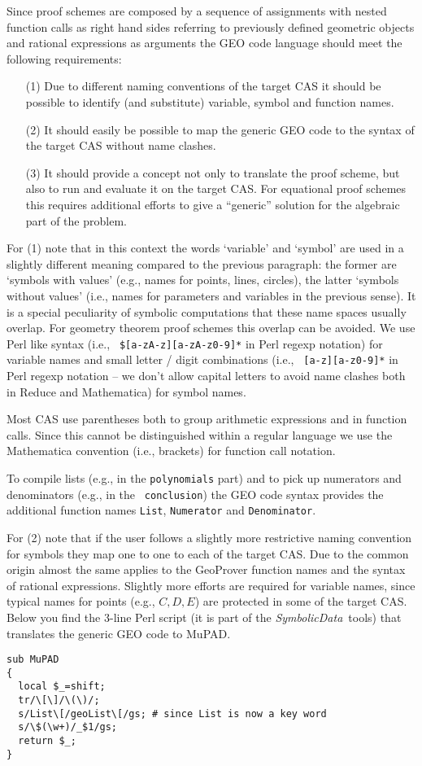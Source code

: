 \documentclass[11pt]{article}
\newcommand{\SD}{{\it Symbo\-lic\-Data}}
\begin{document}
Since proof schemes are composed by a sequence of assignments
with nested function calls as right hand sides referring to
previously defined geometric objects and rational expressions as
arguments the GEO code language should meet the following
requirements:
\begin{itemize}\itemsep0pt
\item[(1)] Due to different naming conventions of the target CAS
it should be possible to identify (and substitute) variable,
symbol and function names.
\item[(2)] It should easily be possible to map the generic GEO
code to the syntax of the target CAS without name clashes.
\item[(3)] It should provide a concept not only to translate the
proof scheme, but also to run and evaluate it on the target
CAS. For equational proof schemes this requires additional
efforts to give a ``generic'' solution for the algebraic part of
the problem.
\end{itemize}

For (1) note that in this context the words `variable' and `symbol'
are used in a slightly different meaning compared to the previous
paragraph: the former are `symbols with values' (e.g., names for
points, lines, circles), the latter `symbols without values' (i.e.,
names for parameters and variables in the previous sense). It is a
special peculiarity of symbolic computations that these name spaces
usually overlap. For geometry theorem proof schemes this overlap can
be avoided. We use Perl like syntax (i.e., {\tt
{}\$[a-zA-z][a-zA-z0-9]*} in Perl regexp notation) for variable
names and small letter / digit combinations (i.e., {\tt
[a-z][a-z0-9]*} in Perl regexp notation -- we don't allow capital
letters to avoid name clashes both in Reduce and Mathematica) for
symbol names.

Most CAS use parentheses both to group arithmetic expressions and
in function calls. Since this cannot be distinguished within a
regular language we use the Mathematica convention (i.e.,
brackets) for function call notation. 

To compile lists (e.g., in the {\tt polynomials} part) and to
pick up numerators and denominators (e.g., in the {\tt
conclusion}) the GEO code syntax provides the additional function
names {\tt List}, {\tt Numerator} and {\tt Denominator}.
\medskip

For (2) note that if the user follows a slightly more restrictive
naming convention for symbols they map one to one to each of the
target CAS.  Due to the common origin almost the same applies to
the GeoProver function names and the syntax of rational
expressions.  Slightly more efforts are required for variable
names, since typical names for points (e.g., $C, D, E$) are
protected in some of the target CAS.  Below you find the 3-line
Perl script (it is part of the \SD\ tools) that translates the
generic GEO code to MuPAD.
\begin{verbatim}
sub MuPAD 
{
  local $_=shift;
  tr/\[\]/\(\)/;
  s/List\[/geoList\[/gs; # since List is now a key word 
  s/\$(\w+)/_$1/gs; 
  return $_;
}
\end{verbatim}
\end{document}
